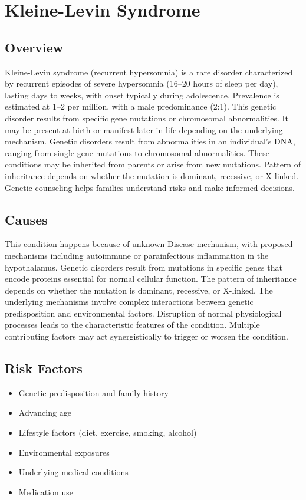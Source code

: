 \chapter{Kleine-Levin Syndrome}
\label{sec:Kleine-Levin Syndrome}

\section{Overview}
Kleine-Levin syndrome (recurrent hypersomnia) is a rare disorder characterized by recurrent episodes of severe hypersomnia (16--20 hours of sleep per day), lasting days to weeks, with onset typically during adolescence. Prevalence is estimated at 1--2 per million, with a male predominance (2:1). This genetic disorder results from specific gene mutations or chromosomal abnormalities. It may be present at birth or manifest later in life depending on the underlying mechanism. Genetic disorders result from abnormalities in an individual's DNA, ranging from single-gene mutations to chromosomal abnormalities. These conditions may be inherited from parents or arise from new mutations. Pattern of inheritance depends on whether the mutation is dominant, recessive, or X-linked. Genetic counseling helps families understand risks and make informed decisions.
\section{Causes}
This condition happens because of unknown Disease mechanism, with proposed mechanisms including autoimmune or parainfectious inflammation in the hypothalamus. Genetic disorders result from mutations in specific genes that encode proteins essential for normal cellular function. The pattern of inheritance depends on whether the mutation is dominant, recessive, or X-linked. The underlying mechanisms involve complex interactions between genetic predisposition and environmental factors. Disruption of normal physiological processes leads to the characteristic features of the condition. Multiple contributing factors may act synergistically to trigger or worsen the condition.
\section{Risk Factors}


\begin{itemize}[noitemsep]
  \item Genetic predisposition and family history
  \item Advancing age
  \item Lifestyle factors (diet, exercise, smoking, alcohol)
  \item Environmental exposures
  \item Underlying medical conditions
  \item Medication use
\end{itemize}
